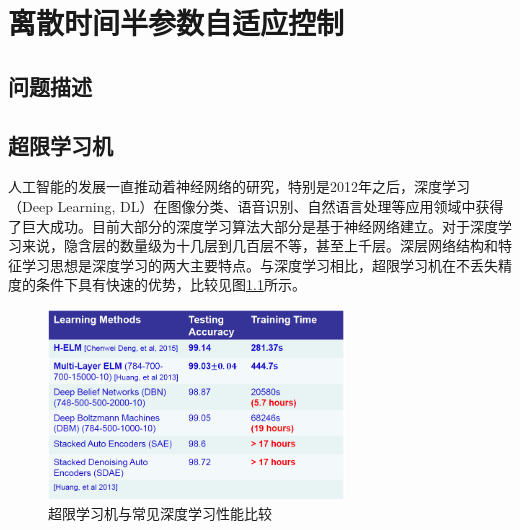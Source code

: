 \chapter{离散时间半参数自适应控制}\label{chap:4}

\section{问题描述}\label{sect:4.1}

\section{超限学习机}\label{sect:4.2}

人工智能的发展一直推动着神经网络的研究，特别是2012年之后，深度学习（Deep Learning, DL）在图像分类、语音识别、自然语言处理等应用领域中获得了巨大成功。目前大部分的深度学习算法大部分是基于神经网络建立。对于深度学习来说，隐含层的数量级为十几层到几百层不等，甚至上千层。深层网络结构和特征学习思想是深度学习的两大主要特点。与深度学习相比，超限学习机在不丢失精度的条件下具有快速的优势，比较见图\ref{fig:elm-dl}所示。

\begin{figure}
 \centering
 \includegraphics[width=0.7\textwidth]{figures/elm-dl}
 \caption{超限学习机与常见深度学习性能比较}\label{fig:elm-dl}
\end{figure}
